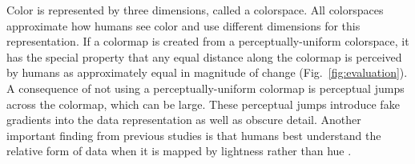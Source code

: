 \documentclass[10pt,journal,compsoc]{IEEEtran}
\begin{document}
\nocite{treinish1998should}
\nocite{borkin2011evaluation}
\nocite{thyng2016true}
\nocite{Spence:1999ea}



Color is represented by three dimensions, called a colorspace. All colorspaces approximate how humans see color and use different dimensions for this representation. If a colormap is created from a perceptually-uniform colorspace, it has the special property that any equal distance along the colormap is perceived by humans as approximately equal in magnitude of change (Fig.~\ref{fig:evaluation}). A consequence of not using a perceptually-uniform colormap is perceptual jumps across the colormap, which can be large. These perceptual jumps introduce fake gradients into the data representation as well as obscure detail. Another important finding from previous studies is that humans best understand the relative form of data when it is mapped by lightness rather than hue \citep{kovesi2015good}.


\nocite{kovesi2015good}
\end{document}
